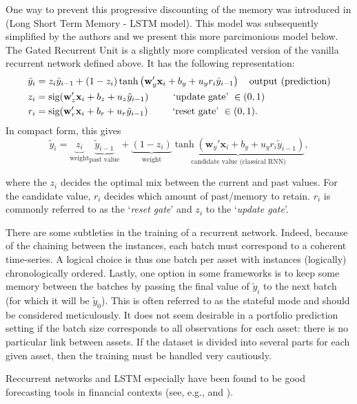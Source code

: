 \documentclass[]{krantz}
\theoremstyle{definition}
\theoremstyle{definition}
\theoremstyle{definition}
\theoremstyle{remark}
\begin{document}
One way to prevent this progressive discounting of the memory was
introduced in \citet{hochreiter1997long} (Long Short Term Memory - LSTM
model). This model was subsequently simplified by the authors
\citet{chung2015gated} and we present this more parcimonious model
below. The Gated Recurrent Unit is a slightly more complicated version
of the vanilla recurrent network defined above. It has the following
representation: \begin{align*}
\tilde{y}_i&=z_i\tilde{y}_{i-1}+ (1-z_i)\tanh \left(\textbf{w}_y'\textbf{x}_i+ b_y+ u_yr_i\tilde{y}_{i-1}\right) \quad \text{output (prediction)} \\
z_i &= \text{sig}(\textbf{w}_z'\textbf{x}_i+b_z+u_z\tilde{y}_{i-1})  \hspace{9mm} \text{`update gate'} \ \in (0,1)\\
r_i &= \text{sig}(\textbf{w}_r'\textbf{x}_i+b_r+u_r\tilde{y}_{i-1}) \hspace{9mm} \text{`reset gate'}  \ \in (0,1).
\end{align*} In compact form, this gives
\[\tilde{y}_i=\underbrace{z_i}_{\text{weight}}\underbrace{\tilde{y}_{i-1}}_{\text{past value}}+ \underbrace{(1-z_i)}_{\text{weight}}\underbrace{\tanh \left(\textbf{w}_y'\textbf{x}_i+ b_y+ u_yr_i\tilde{y}_{i-1}\right)}_{\text{candidate value (classical RNN)}}, \]

where the \(z_i\) decides the optimal mix between the current and past
values. For the candidate value, \(r_i\) decides which amount of
past/memory to retain. \(r_i\) is commonly referred to as the
`\emph{reset gate}' and \(z_i\) to the `\emph{update gate}'.

There are some subtleties in the training of a recurrent network.
Indeed, because of the chaining between the instances, each batch must
correspond to a coherent time-series. A logical choice is thus one batch
per asset with instances (logically) chronologically ordered. Lastly,
one option in some frameworks is to keep some memory between the batches
by passing the final value of \(\tilde{y}_i\) to the next batch (for
which it will be \(\tilde{y}_0\)). This is often referred to as the
stateful mode and should be considered meticulously. It does not seem
desirable in a portfolio prediction setting if the batch size
corresponds to all observations for each asset: there is no particular
link between assets. If the dataset is divided into several parts for
each given asset, then the training must be handled very cautiously.

Reccurrent networks and LSTM especially have been found to be good
forecasting tools in financial contexts (see, e.g.,
\citet{fischer2018deep} and \citet{wang2019portfolio}).
\end{document}

